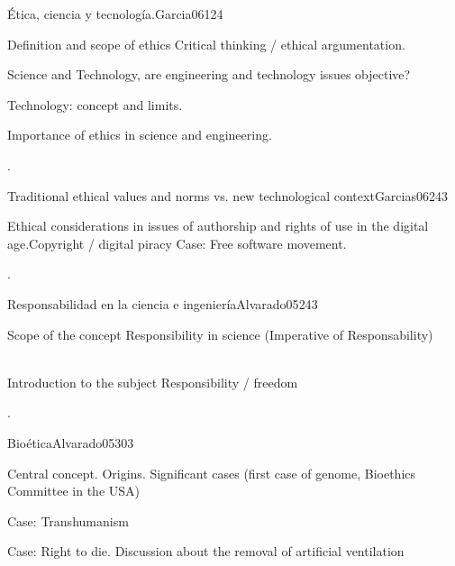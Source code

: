 \begin{syllabus}
\begin{unit}{Ética, ciencia y tecnología.}{}{Garcia06}{12}{4}
   \begin{topics}
      \item Definition and scope of ethics Critical thinking / ethical argumentation.
      \item Science and Technology, are engineering and technology issues objective?
      \item Technology: concept and limits.
      \item Importance of ethics in science and engineering.
   \end{topics}
   \begin{learningoutcomes}
      \item .
   \end{learningoutcomes}
\end{unit}

\begin{unit}{Traditional ethical values and norms vs. new technological context}{}{Garcias06}{24}{3}
   \begin{topics}
      \item Ethical considerations in issues of authorship and rights of use in the digital age.Copyright / digital piracy Case: Free software movement.
   \end{topics}

   \begin{learningoutcomes}
      \item .
      \end{learningoutcomes}
\end{unit}

\begin{unit}{Responsabilidad en la ciencia e ingeniería}{}{Alvarado05}{24}{3}
   \begin{topics}
      \item Scope of the concept Responsibility in science (Imperative of Responsability)
      \item Introduction to the subject Responsibility / freedom
   \end{topics}

   \begin{learningoutcomes}
      \item .
   \end{learningoutcomes}
\end{unit}

\begin{unit}{Bioética}{}{Alvarado05}{30}{3}
   \begin{topics}
      \item Central concept. Origins. Significant cases (first case of genome, Bioethics Committee in the USA)
      \item Case: Transhumanism
      \item Case: Right to die. Discussion about the removal of artificial ventilation
   \end{topics}


\end{unit}
\end{syllabus}

